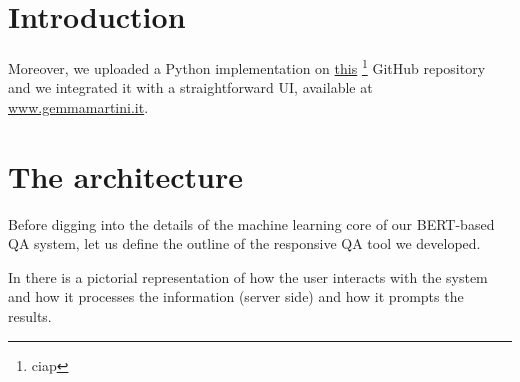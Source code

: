 \documentclass[12pt,a4paper,hidelinks]{article}
\begin{document}

\newpage
\setcounter{page}{1}

\section{Introduction}\label{sec:intro}

Moreover, we uploaded a Python implementation on \href{cia}{this} \footnote{ciap} GitHub repository and we integrated it with a straightforward UI, available at \href{www.gemmamartini.it}{www.gemmamartini.it}.



\section{The architecture}\label{sec:model}
Before digging into the details of the machine learning core of our BERT-based QA system, let us define the outline of the responsive QA tool we developed.

In  there is a pictorial representation of how the user interacts with the system and how it processes the information (server side) and how it prompts the results.
\end{document}
